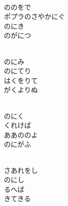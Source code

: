 \documentclass[10pt,b5j]{tarticle} %
\begin{document}
\begin{enumerate}
\begin{minipage}[c]{\blocksize}
    \end{minipage}
    \begin{minipage}[c]{\blocksize}
        
        \vspace{\linespace}
        \item~\\
        ののをで\\
        ポプラのさやかにぐ\\
        のにき\\
        のがにつ
        
    \end{minipage}
    \begin{minipage}[c]{\blocksize}
        
        \vspace{\linespace}
        \item~\\
        のにみ\\
        のにてり\\
        はくをりて\\
        がくよりぬ
        
    \end{minipage}
    \begin{minipage}[c]{\blocksize}
        
        \vspace{\linespace}
        \item~\\
        のにく\\
        くれけば\\
        ああののよ\\
        のにがふ
        
    \end{minipage}
    \begin{minipage}[c]{\blocksize}
        
        \vspace{\linespace}
        \item~\\
        さあれをし\\
        のにし\\
        るへば\\
        きてきる
        

\end{minipage}
\end{enumerate}
\end{document}
